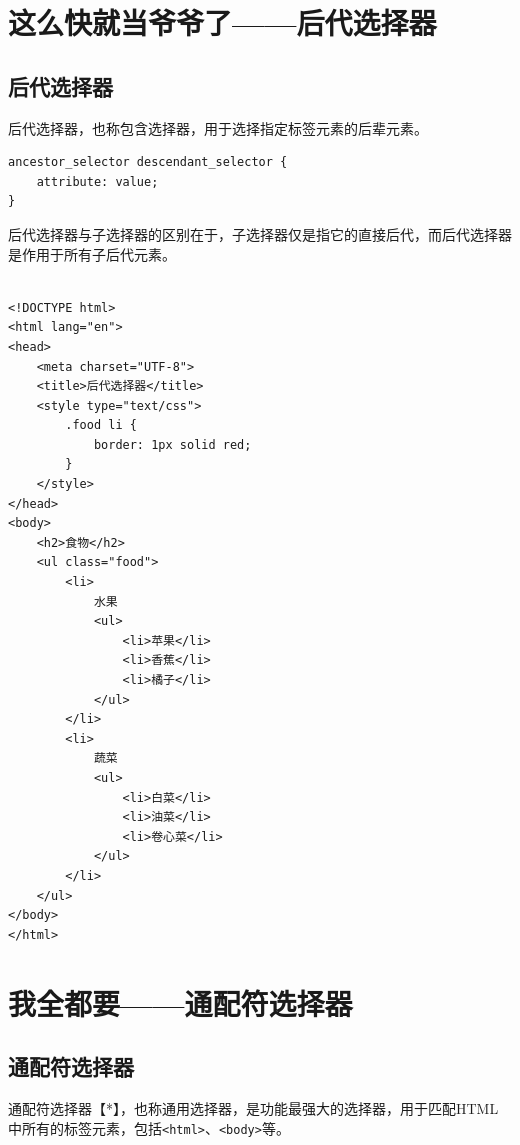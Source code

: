 \newpage

\section{这么快就当爷爷了——后代选择器}

\subsection{后代选择器}

后代选择器，也称包含选择器，用于选择指定标签元素的后辈元素。 \\

\begin{lstlisting}[style=htmlcssjs]
ancestor_selector descendant_selector {
    attribute: value;
}
\end{lstlisting}

后代选择器与子选择器的区别在于，子选择器仅是指它的直接后代，而后代选择器是作用于所有子后代元素。 \\

 \\
\begin{lstlisting}[style=htmlcssjs]
<!DOCTYPE html>
<html lang="en">
<head>
    <meta charset="UTF-8">
    <title>后代选择器</title>
    <style type="text/css">
        .food li {
            border: 1px solid red;
        }
    </style>
</head>
<body>
    <h2>食物</h2>
    <ul class="food">
        <li>
            水果
            <ul>
                <li>苹果</li>
                <li>香蕉</li>
                <li>橘子</li>
            </ul>
        </li>
        <li>
            蔬菜
            <ul>
                <li>白菜</li>
                <li>油菜</li>
                <li>卷心菜</li>
            </ul>
        </li>
    </ul>
</body>
</html>
\end{lstlisting}

\newpage

\section{我全都要——通配符选择器}

\subsection{通配符选择器}

通配符选择器【*】，也称通用选择器，是功能最强大的选择器，用于匹配HTML中所有的标签元素，包括\lstinline|<html>|、\lstinline|<body>|等。 \\


